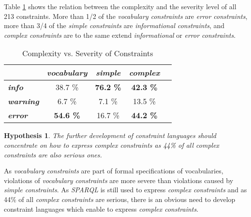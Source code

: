 \documentclass{llncs}
\newtheorem{hyp}{Hypothesis}
\begin{document}
{{Table \ref{tab:evaluation-complexity-severity} shows the relation between the complexity and the severity level of all 213 constraints.
More than 1/2 of the \emph{vocabulary constraints} are \emph{error constraints},
more than 3/4 of the \emph{simple constraints} are \emph{informational constraints}, and
\emph{complex constraints} are to the same extend \emph{informational} or \emph{error constraints}. 

\begin{table}[H]
		\scriptsize
    \begin{center}
    \begin{tabular}{@{}lcccc@{}}
    \\       \textbf{}
           & \textbf{\emph{vocabulary}}
           & \textbf{\emph{simple}}
					 & \textbf{\emph{complex}}
    \\ \midrule
		\textbf{\emph{info}} & 38.7 \% & \textbf{76.2 \%} & \textbf{42.3 \%} \\
		\textbf{\emph{warning}} & 6.7 \% & 7.1 \% & 13.5 \% \\
		\textbf{\emph{error}} & \textbf{54.6 \%} & 16.7 \% & \textbf{44.2 \%} \\
    \bottomrule
    \end{tabular}
    \caption{Complexity vs. Severity of Constraints}
		\label{tab:evaluation-complexity-severity}
    \end{center}
\end{table}

\begin{hyp}
The further development of constraint languages should concentrate on how to express complex constraints as 44\% of all complex constraints are also serious ones.
\end{hyp}

As \emph{vocabulary constraints} are part of formal specifications of vocabularies,
violations of \emph{vocabulary constraints} are more severe than violations caused by \emph{simple constraints}.
As \emph{SPARQL} is still used to express \emph{complex constraints} and as 44\% of all \emph{complex constraints} are serious,
there is an obvious need to develop constraint languages which enable to express \emph{complex constraints}.

}}
\end{document}
